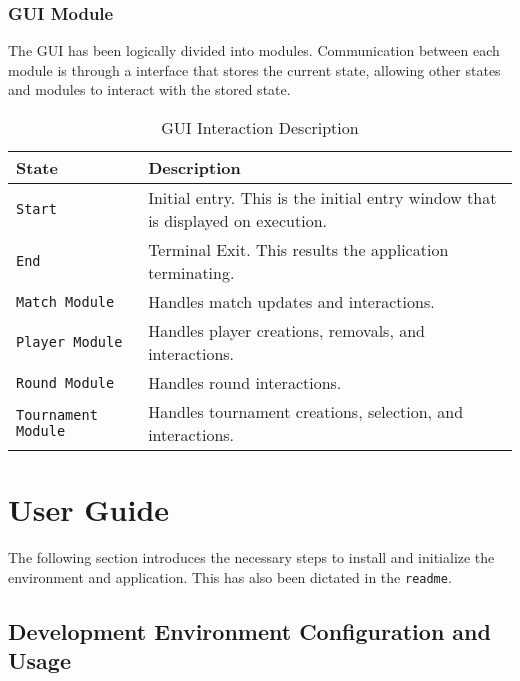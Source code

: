 \documentclass[11pt]{article}
\begin{document}
            \subsubsection{GUI Module}
                The GUI has been logically divided into modules. Communication between each module is through a interface that stores the current state, allowing other states and modules to interact with the stored state.
                \begin{table*}[h!]
                    \centering
                    \begin{tabulary}{\textwidth}{|p{12em}|p{32em}|}
                        \hline
                        \textbf{State}                      & \textbf{Description} \\
                        \hline
                        \texttt{Start}                      & Initial entry. This is the initial entry window that is displayed on execution.\\
                        \hline
                        \texttt{End}                        & Terminal Exit. This results the application terminating.\\
                        \hline
                        \texttt{Match Module}               & Handles match updates and interactions.\\
                        \hline
                        \texttt{Player Module}              & Handles player creations, removals, and interactions.\\
                        \hline
                        \texttt{Round Module}               & Handles round interactions.\\
                        \hline
                        \texttt{Tournament Module}          & Handles tournament creations, selection, and interactions.\\
                        \hline
                        \end{tabulary}
                    \caption{GUI Interaction Description}
                \end{table*}
    \newpage

    \section{User Guide}
        The following section introduces the necessary steps to install and initialize the environment and application. This has also been dictated in the \texttt{readme}.
        \subsection{Development Environment Configuration and Usage}
\end{document}
